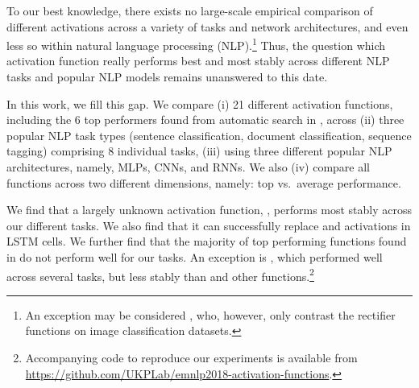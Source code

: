 To our best knowledge, there exists no large-scale empirical comparison of different activations across a variety of tasks and network architectures, and even less so within natural language processing (NLP).\footnote{An exception may be considered \citet{Xu:2015}, who, however, only contrast the rectifier functions on image classification datasets.} Thus, the question which activation function really performs best and most stably across different NLP tasks and popular NLP models remains unanswered to this date. 

In this work, we fill this gap. We compare (i) 21 different activation functions, including the 6 top performers found from automatic search in \citet{Ramach:2018}, across (ii) three popular NLP task types (sentence classification, document classification, sequence tagging) comprising 8 individual tasks, (iii) using three different popular NLP architectures, namely, MLPs, CNNs, and RNNs. We also (iv) compare all functions across two different dimensions, namely: top vs.\ average performance. 

We find that %
a largely unknown activation function, \pentan{} \cite{Xu:2016}, performs most stably across our different tasks. We also find that it can successfully replace \mytanh{} and \sigmoid{} activations in LSTM cells. We further find that the majority of top performing functions found in \citet{Ramach:2018} do not perform well for our tasks. An exception is \swish{}, which performed well across several tasks, but less stably than \pentan{} and other functions.\footnote{Accompanying code to reproduce our experiments is available from \url{https://github.com/UKPLab/emnlp2018-activation-functions}.}

